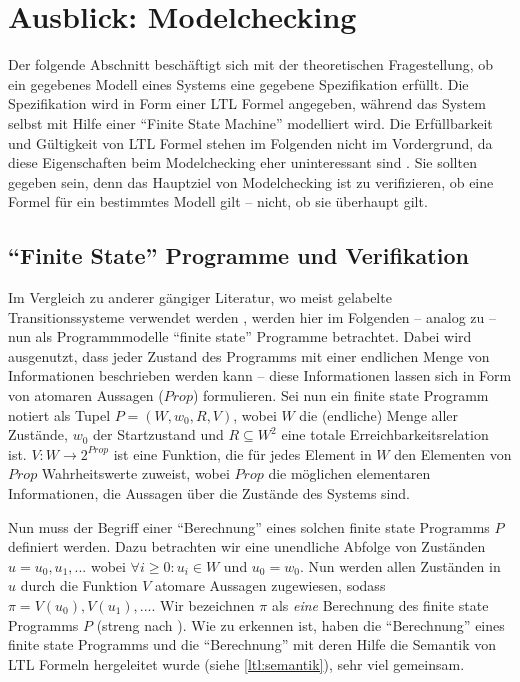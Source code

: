 \section{Ausblick: Modelchecking}

Der folgende Abschnitt beschäftigt sich mit der theoretischen Fragestellung, ob ein gegebenes Modell eines Systems eine gegebene Spezifikation erfüllt. Die Spezifikation wird in Form einer LTL Formel angegeben, während das System selbst mit Hilfe einer "`Finite State Machine"' modelliert wird. Die Erfüllbarkeit und Gültigkeit von LTL Formel stehen im Folgenden nicht im Vordergrund, da diese Eigenschaften beim Modelchecking eher uninteressant sind \cite{vardi+96}. Sie sollten gegeben sein, denn das Hauptziel von Modelchecking ist zu verifizieren, ob eine Formel für ein bestimmtes Modell gilt -- nicht, ob sie überhaupt gilt. 

\subsection{"`Finite State"' Programme und Verifikation}

Im Vergleich zu anderer gängiger Literatur, wo meist gelabelte Transitionssysteme verwendet werden \cite{huth+04}, werden hier im Folgenden -- analog zu \cite{vardi+96} -- nun als Programmmodelle "`finite state"' Programme betrachtet. Dabei wird ausgenutzt, dass jeder Zustand des Programms mit einer endlichen Menge von Informationen beschrieben werden kann -- diese Informationen lassen sich in Form von atomaren Aussagen ($Prop$) formulieren. Sei nun ein finite state Programm notiert als Tupel $P = (W, w_0, R, V)$, wobei $W$ die (endliche) Menge aller Zustände, $w_0$ der Startzustand und $R \subseteq W^2$ eine totale Erreichbarkeitsrelation ist. $V: W \rightarrow 2^{Prop}$ ist eine Funktion, die für jedes Element in $W$ den Elementen von $Prop$ Wahrheitswerte zuweist, wobei $Prop$ die möglichen elementaren Informationen, die Aussagen über die Zustände des Systems sind.

Nun muss der Begriff einer "`Berechnung"' eines solchen finite state Programms $P$ definiert werden. Dazu betrachten wir eine unendliche Abfolge von Zuständen $u = u_0, u_1, ... $ wobei $\forall i \geq 0: u_i \in W$ und $u_0 = w_0$. Nun werden allen Zuständen in $u$ durch die Funktion $V$ atomare Aussagen zugewiesen, sodass $\pi = V(u_0), V(u_1), ...$. Wir bezeichnen $\pi$ als \textit{eine} Berechnung des finite state Programms $P$ (streng nach \cite{vardi+96}). Wie zu erkennen ist, haben die "`Berechnung"' eines finite state Programms und die "`Berechnung"' mit deren Hilfe die Semantik von LTL Formeln hergeleitet wurde (siehe \ref{ltl:semantik}), sehr viel gemeinsam. 

